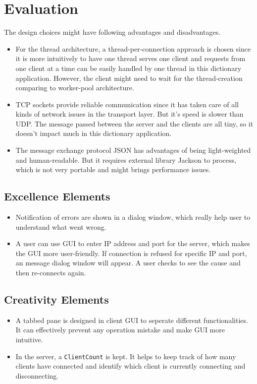\documentclass[12pt]{article}
\begin{document}
\section{Evaluation}
The design choices might have following advantages and disadvantages.
\begin{itemize}
\item For the thread architecture, a thread-per-connection approach is chosen since it is more intuitively to have one thread serves one client and requests from one client at a time can be easily handled by one thread in this dictionary application. However, the client might need to wait for the thread-creation comparing to worker-pool architecture.
\item TCP sockets provide reliable communication since it has taken care of all kinds of network issues in the transport layer. But it's speed is slower than UDP. The message passed between the server and the clients are all tiny, so it doesn't impact much in this dictionary application.
\item The message exchange protocol JSON has advantages of being light-weighted and human-readable. But it requires external library Jackson to process, which is not very portable and might brings performance issues.
\end{itemize}

\subsection{Excellence Elements}
\begin{itemize}
\item Notification of errors are shown in a dialog window, which really help user to understand what went wrong.
\item A user can use GUI to enter IP address and port for the server, which makes the GUI more user-friendly. If connection is refused for specific IP and port, an message dialog window will appear. A user checks to see the cause and then re-connects again.
\end{itemize}
\subsection{Creativity Elements}
\begin{itemize}
\item A tabbed pane is designed in client GUI to seperate different functionalities. It can effectively prevent any operation mistake and make GUI more intuitive. 
\item In the server, a \texttt{ClientCount} is kept. It helps to keep track of how many clients have connected and identify which client is currently connecting and disconnecting.
\end{itemize}
\end{document}
